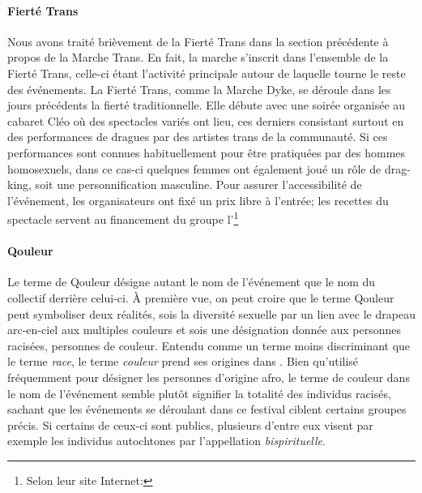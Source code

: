 \paragraph{Fierté Trans}
\label{subsec:fiertetrans}
Nous avons traité brièvement de la Fierté Trans dans la section précédente à propos de la Marche Trans.
En fait, la marche s'inscrit dans l'ensemble de la Fierté Trans, celle-ci étant l'activité principale autour de laquelle tourne le reste des événements.
La Fierté Trans, comme la Marche Dyke, se déroule dans les jours précédents la fierté traditionnelle.
Elle débute avec une soirée organisée au cabaret Cléo où des spectacles variés ont lieu, ces derniers consistant surtout en des performances de dragues par des artistes trans de la communauté.
Si ces performances sont connues habituellement pour être pratiquées par des hommes homosexuels, dans ce cas-ci quelques femmes ont également joué un rôle de drag-king, soit une personnification masculine.
Pour assurer l'accessibilité de l'événement, les organisateurs ont fixé un prix libre à l'entrée; les recettes du spectacle servent au financement du groupe l'\astteq{}\footnote{Selon leur site Internet: }

\paragraph{Qouleur}
\label{subsec:qouleur}
Le terme de Qouleur désigne autant le nom de l'événement que le nom du collectif derrière celui-ci.
À première vue, on peut croire que le terme Qouleur peut symboliser deux réalités, sois la diversité sexuelle par un lien avec le drapeau arc-en-ciel aux multiples couleurs et sois une désignation donnée aux personnes racisées, personnes de couleur.
Entendu comme un terme moins discriminant que le terme \emph{race}, le terme \emph{couleur} prend ses origines dans .
Bien qu'utilisé fréquemment pour désigner les personnes d'origine afro, le terme de couleur dans le nom de l'événement semble plutôt signifier la totalité des individus racisés, sachant que les événements se déroulant dans ce festival ciblent certains groupes précis.
Si certains de ceux-ci sont publics, plusieurs d'entre eux visent par exemple les individus autochtones par l'appellation  \emph{bispirituelle}.

